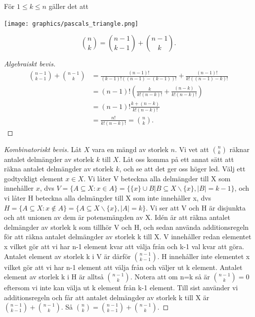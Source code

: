 \documentclass[nobib]{tufte-handout}
\begin{document}
\begin{proposition}
  För $1 \leq k \leq n$ gäller det att
  
  \begin{marginfigure}
    \texttt{[image: graphics/pascals\_triangle.png]}
  \end{marginfigure}
  $$\binom{n}{k} = \binom{n-1}{k-1} + \binom{n-1}{k}.$$

  \begin{proof}[Algebraiskt bevis]
    \begin{align*}
      \binom{n-1}{k-1} + \binom{n-1}{k} &= \frac{(n-1)!}{(k-1)!((n-1)-(k-1))!} + \frac{(n-1)!}{k!((n-1)-k)!}\\
      &= (n-1)!\left(\frac{k}{k!(n-k)!} + \frac{(n-k)}{k!(n-k)!}\right)\\
      &= (n-1)!\frac{k + (n - k)}{k!(n-k)!}\\
      &= \frac{n!}{k!(n-k)!} = \binom{n}{k}.
    \end{align*}    
  \end{proof}

  \begin{proof}[Kombinatoriskt bevis]
    Låt $X$ vara en mängd av storlek $n$. Vi vet att $\binom{n}{k}$ räknar antalet delmängder av storlek $k$ till $X$. Låt oss komma på ett annat sätt att räkna antalet delmängder av storlek $k$, och se att det ger oss höger led.
    Välj ett godtyckligt element $x \in X$. Vi låter V beteckna alla delmängder till X som innehåller $x$, dvs $V=\{A\subseteq X:x\in A\} =\{ \{ x\} \cup B | B \subseteq X \backslash \{ x\} , |B|=k-1\}$, och vi låter H beteckna alla delmängder till X som inte innehåller x, dvs $H=\{A\subseteq X:x\notin A\} =\{A \subseteq X \backslash \{ x\} , |A|=k\}$. Vi ser att V och H är disjunkta och att unionen av dem är potensmängden av X. Idén är att räkna antalet delmängder av storlek k som tillhör V och H, och sedan använda additionsregeln för att räkna antalet delmängder av storlek k till X. 
    V innehåller redan elementet x vilket gör att vi har n-1 element kvar att välja från och k-1 val kvar att göra. Antalet element av storlek k i V är därför $\binom{n-1}{k-1}$.
    H innehåller inte elementet x vilket gör att vi har n-1 element att välja från och väljer ut k element. Antalet element av storlek k i H är alltså $\binom{n-1}{k}$. Notera att om n=k så är $\binom{n-1}{k}=0$ eftersom vi inte kan välja ut k element från k-1 element. 
    Till sist använder vi additionsregeln och får att antalet delmängder av storlek k till X är $\binom{n-1}{k-1} +\binom{n-1}{k}$. Så $\binom{n}{k}=\binom{n-1}{k-1}+\binom{n-1}{k}$. 
  \end{proof}
\end{proposition}
\end{document}

